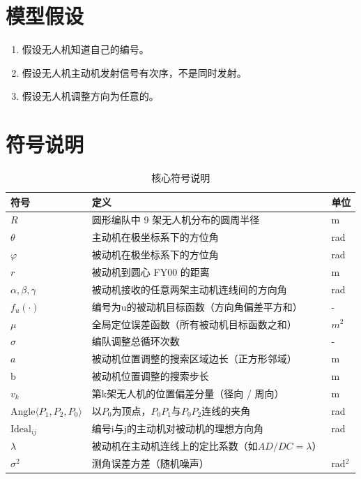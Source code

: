 \documentclass[withoutpreface,bwprint]{cumcmthesis} %
\begin{document}
\section{模型假设}

\begin{enumerate}
    \item 假设无人机知道自己的编号。
    \item 假设无人机主动机发射信号有次序，不是同时发射。
    \item 假设无人机调整方向为任意的。
\end{enumerate}

\section{符号说明}

\begin{table}[htbp]
    \centering
    \caption{核心符号说明}
    \label{tab_symbols}
    \begin{tabular}{@{}lll@{}}
        \toprule
        \textbf{符号} & \textbf{定义} & \textbf{单位} \\
        \midrule
        $R$  & 圆形编队中 9 架无人机分布的圆周半径 & m\\
        \(\theta\)&主动机在极坐标系下的方位角&rad\\
        \(\varphi\)&被动机在极坐标系下的方位角&rad\\
        $r$&被动机到圆心 FY00 的距离&m\\
        \(\alpha, \beta, \gamma\) & 被动机接收的任意两架主动机连线间的方向角&rad \\ 
        \(f_u(\cdot)\)&编号为u的被动机目标函数（方向角偏差平方和）&-\\
        \(\mu\) & 全局定位误差函数（所有被动机目标函数之和）&$m^2$\\
        \(\sigma\) & 编队调整总循环次数& -\\
        $a$ & 被动机位置调整的搜索区域边长（正方形邻域）& m\\
        b & 被动机位置调整的搜索步长& m\\
        \(v_k\)& 第k架无人机的位置偏差分量（径向 / 周向）& m\\
        \(\text{Angle}\langle P_1, P_2, P_0 \rangle\)& 以\(P_0\)为顶点，\(P_0P_1\)与\(P_0P_2\)连线的夹角&rad\\
        \(\text{Ideal}_{ij}\) &  编号i与j的主动机对被动机的理想方向角 & rad \\
        \(\lambda\)&被动机在主动机连线上的定比系数（如\(AD/DC=\lambda\)）\\
        \(\sigma^2\)&测角误差方差（随机噪声）&rad$^2$\\
        \bottomrule
    \end{tabular}
\end{table}
\end{document}
